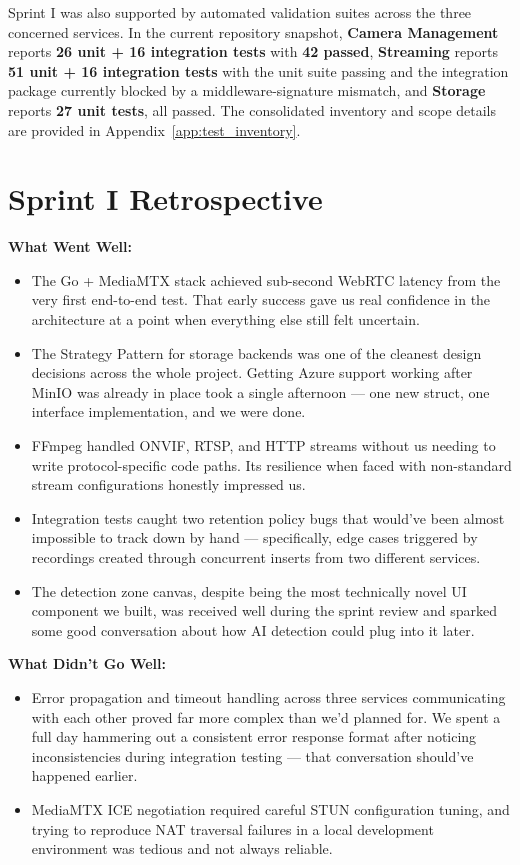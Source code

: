 \documentclass[12pt,a4paper,oneside]{report}
\begin{document}
\hspace{0.8cm}Sprint I was also supported by automated validation suites across the three concerned services. In the current repository snapshot, \textbf{Camera Management} reports \textbf{26 unit + 16 integration tests} with \textbf{42 passed}, \textbf{Streaming} reports \textbf{51 unit + 16 integration tests} with the unit suite passing and the integration package currently blocked by a middleware-signature mismatch, and \textbf{Storage} reports \textbf{27 unit tests}, all passed. The consolidated inventory and scope details are provided in Appendix~\ref{app:test_inventory}.

\section{Sprint I Retrospective}
\label{sec:s1_retrospective}

\textbf{What Went Well:}
\begin{itemize}
  \item The Go + MediaMTX stack achieved sub-second WebRTC latency from the very first end-to-end test. That early success gave us real confidence in the architecture at a point when everything else still felt uncertain.
  \item The Strategy Pattern for storage backends was one of the cleanest design decisions across the whole project. Getting Azure support working after MinIO was already in place took a single afternoon — one new struct, one interface implementation, and we were done.
  \item FFmpeg handled ONVIF, RTSP, and HTTP streams without us needing to write protocol-specific code paths. Its resilience when faced with non-standard stream configurations honestly impressed us.
  \item Integration tests caught two retention policy bugs that would've been almost impossible to track down by hand — specifically, edge cases triggered by recordings created through concurrent inserts from two different services.
  \item The detection zone canvas, despite being the most technically novel UI component we built, was received well during the sprint review and sparked some good conversation about how AI detection could plug into it later.
\end{itemize}

\textbf{What Didn't Go Well:}
\begin{itemize}
  \item Error propagation and timeout handling across three services communicating with each other proved far more complex than we'd planned for. We spent a full day hammering out a consistent error response format after noticing inconsistencies during integration testing — that conversation should've happened earlier.
  \item MediaMTX ICE negotiation required careful STUN configuration tuning, and trying to reproduce NAT traversal failures in a local development environment was tedious and not always reliable.
\end{itemize}
\end{document}
